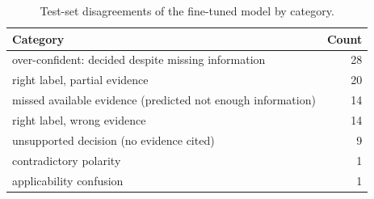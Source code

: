 \begin{table}[t]\centering\caption{Test-set disagreements of the fine-tuned model by category.}\label{tab:errcat}
\begin{tabular}{lr}\toprule Category & Count\\\midrule
over-confident: decided despite missing information & 28\\
right label, partial evidence & 20\\
missed available evidence (predicted not enough information) & 14\\
right label, wrong evidence & 14\\
unsupported decision (no evidence cited) & 9\\
contradictory polarity & 1\\
applicability confusion & 1\\
\bottomrule\end{tabular}\end{table}
